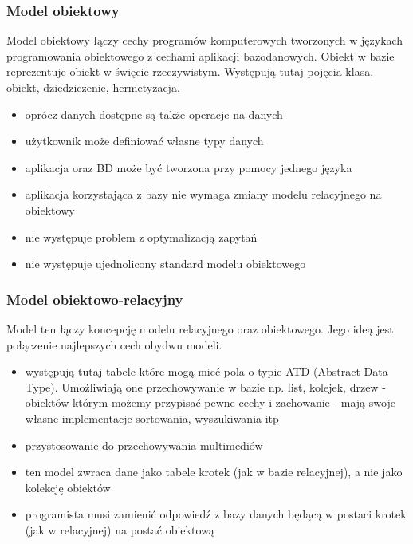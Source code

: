 \documentclass[a4paper,12pt,oneside]{book}
\begin{document}
			\subsubsection{Model obiektowy}
			Model obiektowy łączy cechy programów komputerowych tworzonych w językach programowania obiektowego z cechami aplikacji bazodanowych. Obiekt w bazie reprezentuje obiekt w święcie rzeczywistym. Występują tutaj pojęcia klasa, obiekt, dziedziczenie, hermetyzacja. 
			\begin{itemize}
			\itemsep 0em
			\item oprócz danych dostępne są także operacje na danych
			\item użytkownik może definiować własne typy danych
			\item aplikacja oraz BD może być tworzona przy pomocy jednego języka
			\item aplikacja korzystająca z bazy nie wymaga zmiany modelu relacyjnego na obiektowy
			\item nie występuje problem z optymalizacją zapytań
			\item nie występuje ujednolicony standard modelu obiektowego
			\end{itemize}
			
			\subsubsection{Model obiektowo-relacyjny}
			Model ten łączy koncepcję modelu relacyjnego oraz obiektowego. Jego ideą jest połączenie najlepszych cech obydwu modeli.
			\begin{itemize}
				\itemsep 0em
				\item występują tutaj tabele które mogą mieć pola o typie ATD (Abstract Data Type). Umożliwiają one przechowywanie w bazie np. list, kolejek, drzew - obiektów którym możemy przypisać pewne cechy i zachowanie - mają swoje własne implementacje sortowania, wyszukiwania itp
				\item przystosowanie do przechowywania multimediów
				\item ten model zwraca dane jako tabele krotek (jak w bazie relacyjnej), a nie jako kolekcję
				obiektów
				\item programista musi zamienić odpowiedź z bazy danych będącą w postaci krotek (jak w
				relacyjnej) na postać obiektową
			\end{itemize}
			
\end{document}

